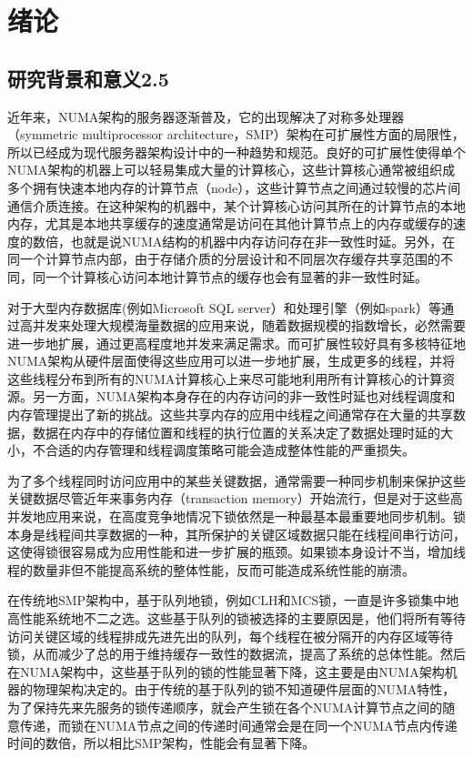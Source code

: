 
\chapter{绪论}
\label{chap:intro}


\section{研究背景和意义2.5}
近年来，NUMA架构的服务器逐渐普及，它的出现解决了对称多处理器（symmetric multiprocessor architecture，SMP）架构在可扩展性方面的局限性，所以已经成为现代服务器架构设计中的一种趋势和规范。良好的可扩展性使得单个NUMA架构的机器上可以轻易集成大量的计算核心，这些计算核心通常被组织成多个拥有快速本地内存的计算节点（node），这些计算节点之间通过较慢的芯片间通信介质连接。在这种架构的机器中，某个计算核心访问其所在的计算节点的本地内存，尤其是本地共享缓存的速度通常是访问在其他计算节点上的内存或缓存的速度的数倍，也就是说NUMA结构的机器中内存访问存在非一致性时延。另外，在同一个计算节点内部，由于存储介质的分层设计和不同层次存缓存共享范围的不同，同一个计算核心访问本地计算节点的缓存也会有显著的非一致性时延。

对于大型内存数据库(例如Microsoft SQL server）和处理引擎（例如spark）等通过高并发来处理大规模海量数据的应用来说，随着数据规模的指数增长，必然需要进一步地扩展，通过更高程度地并发来满足需求。而可扩展性较好具有多核特征地NUMA架构从硬件层面使得这些应用可以进一步地扩展，生成更多的线程，并将这些线程分布到所有的NUMA计算核心上来尽可能地利用所有计算核心的计算资源。另一方面，NUMA架构本身存在的内存访问的非一致性时延也对线程调度和内存管理提出了新的挑战。这些共享内存的应用中线程之间通常存在大量的共享数据，数据在内存中的存储位置和线程的执行位置的关系决定了数据处理时延的大小，不合适的内存管理和线程调度策略可能会造成整体性能的严重损失。

为了多个线程同时访问应用中的某些关键数据，通常需要一种同步机制来保护这些关键数据尽管近年来事务内存（transaction memory）开始流行，但是对于这些高并发地应用来说，在高度竞争地情况下锁依然是一种最基本最重要地同步机制。锁本身是线程间共享数据的一种，其所保护的关键区域数据只能在线程间串行访问，这使得锁很容易成为应用性能和进一步扩展的瓶颈。如果锁本身设计不当，增加线程的数量非但不能提高系统的整体性能，反而可能造成系统性能的崩溃。

在传统地SMP架构中，基于队列地锁，例如CLH和MCS锁，一直是许多锁集中地高性能系统地不二之选。这些基于队列的锁被选择的主要原因是，他们将所有等待访问关键区域的线程排成先进先出的队列，每个线程在被分隔开的内存区域等待锁，从而减少了总的用于维持缓存一致性的数据流，提高了系统的总体性能。然后在NUMA架构中，这些基于队列的锁的性能显著下降，这主要是由NUMA架构机器的物理架构决定的。由于传统的基于队列的锁不知道硬件层面的NUMA特性，为了保持先来先服务的锁传递顺序，就会产生锁在各个NUMA计算节点之间的随意传递，而锁在NUMA节点之间的传递时间通常会是在同一个NUMA节点内传递时间的数倍，所以相比SMP架构，性能会有显著下降。

